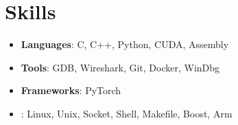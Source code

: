 \documentclass[letterpaper,11pt]{article}
\newcommand{\resumeItem}[2]{
  \item\small{
    \textbf{#1}{: #2 \vspace{-2pt}}
  }
}
\newcommand{\resumeSubItem}[2]{\resumeItem{#1}{#2}\vspace{-4pt}}
\newcommand{\resumeSubHeadingListStart}{\begin{itemize}[leftmargin=*]}
\newcommand{\resumeSubHeadingListEnd}{\end{itemize}}
\begin{document}
\section{Skills}
  \resumeSubHeadingListStart
  \resumeSubItem{Languages}
    {C, C++, Python, CUDA, Assembly}
  \resumeSubItem{Tools}
    {GDB, Wireshark, Git, Docker, WinDbg}
  \resumeSubItem{Frameworks}
    {PyTorch}
  \resumeSubItem{}
    {Linux, Unix, Socket, Shell, Makefile, Boost, Arm}
  \resumeSubHeadingListEnd

\end{document}
